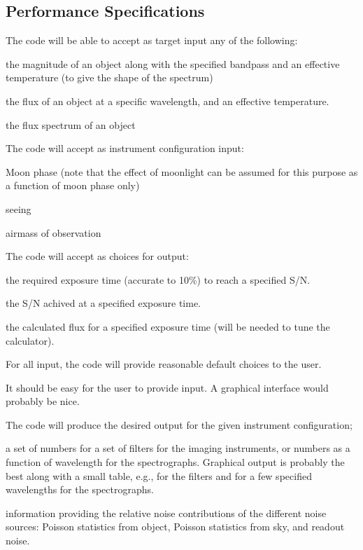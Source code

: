 \documentclass[12pt]{article}
\begin{document}
\subsection*{Performance Specifications}
The code will be able to accept as target input any of the following:
\begin{itemize*}
    \item the magnitude of an object along with the specified bandpass
        and an effective temperature (to give the shape of the spectrum)
    \item the flux of an object at a specific wavelength, and an
        effective temperature.
    \item the flux spectrum of an object 
\end{itemize*}
The code will accept as instrument configuration input:
\begin{itemize*}
    \item Moon phase (note that the effect of moonlight can be assumed
        for this purpose as a function of moon phase only)
    \item seeing
    \item airmass of observation
\end{itemize*}
The code will accept as choices for output:
\begin{itemize*}
    \item the required exposure time (accurate to 10\%) to reach a
        specified S/N.
    \item the S/N achived at a specified exposure time.
    \item the calculated flux for a specified exposure time
                (will be needed to tune the calculator).
\end{itemize*}
For all input, the code will provide reasonable default choices to
the user.

It should be easy for the user to provide input. A graphical
interface would probably be nice.

The code will produce the desired output for the given instrument
configuration;
\begin{itemize*}
    \item a set of numbers for a set of filters for the imaging
        instruments, or numbers as a function of wavelength for the
        spectrographs. Graphical output is probably the best along with a
        small table, e.g., for the filters and for a few specified
        wavelengths for the spectrographs.
    \item information providing the relative noise contributions of the
        different noise sources: Poisson statistics from object,
        Poisson statistics from sky, and readout noise.
\end{itemize*}
\end{document}
